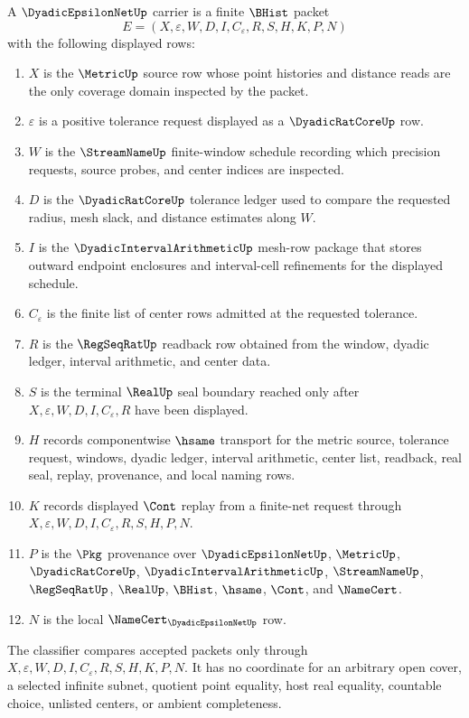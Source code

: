 \begin{definition}
\label{def:dyadic-epsilon-net-carrier}
A $\DyadicEpsilonNetUp$ carrier is a finite $\BHist$ packet
$$
E=(X,\varepsilon,W,D,I,C_{\varepsilon},R,S,H,K,P,N)
$$
with the following displayed rows:
\begin{enumerate}
\item $X$ is the $\MetricUp$ source row whose point histories and distance reads are the only coverage domain inspected by the packet.
\item $\varepsilon$ is a positive tolerance request displayed as a $\DyadicRatCoreUp$ row.
\item $W$ is the $\StreamNameUp$ finite-window schedule recording which precision requests, source probes, and center indices are inspected.
\item $D$ is the $\DyadicRatCoreUp$ tolerance ledger used to compare the requested radius, mesh slack, and distance estimates along $W$.
\item $I$ is the $\DyadicIntervalArithmeticUp$ mesh-row package that stores outward endpoint enclosures and interval-cell refinements for the displayed schedule.
\item $C_{\varepsilon}$ is the finite list of center rows admitted at the requested tolerance.
\item $R$ is the $\RegSeqRatUp$ readback row obtained from the window, dyadic ledger, interval arithmetic, and center data.
\item $S$ is the terminal $\RealUp$ seal boundary reached only after $X,\varepsilon,W,D,I,C_{\varepsilon},R$ have been displayed.
\item $H$ records componentwise $\hsame$ transport for the metric source, tolerance request, windows, dyadic ledger, interval arithmetic, center list, readback, real seal, replay, provenance, and local naming rows.
\item $K$ records displayed $\Cont$ replay from a finite-net request through $X,\varepsilon,W,D,I,C_{\varepsilon},R,S,H,P,N$.
\item $P$ is the $\Pkg$ provenance over $\DyadicEpsilonNetUp$, $\MetricUp$, $\DyadicRatCoreUp$, $\DyadicIntervalArithmeticUp$, $\StreamNameUp$, $\RegSeqRatUp$, $\RealUp$, $\BHist$, $\hsame$, $\Cont$, and $\NameCert$.
\item $N$ is the local $\NameCert_{\DyadicEpsilonNetUp}$ row.
\end{enumerate}
The classifier compares accepted packets only through $X,\varepsilon,W,D,I,C_{\varepsilon},R,S,H,K,P,N$. It has no coordinate for an arbitrary open cover, a selected infinite subnet, quotient point equality, host real equality, countable choice, unlisted centers, or ambient completeness.
\end{definition}

